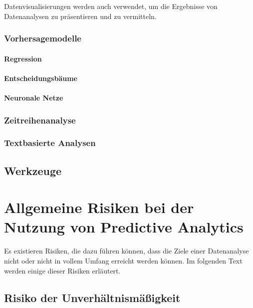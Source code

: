 Datenvisualisierungen werden auch verwendet, um die Ergebnisse von Datenanalysen
zu präsentieren und zu vermitteln. 

\subsubsection{Vorhersagemodelle}

\paragraph{Regression}

\paragraph{Entscheidungsbäume}

\paragraph{Neuronale Netze}

\subsubsection{Zeitreihenanalyse}


\subsubsection{Textbasierte Analysen}

\subsection{Werkzeuge}


\section{Allgemeine Risiken bei der Nutzung von Predictive Analytics}

Es existieren Risiken, die dazu führen können, dass die Ziele einer
Datenanalyse nicht oder nicht in vollem Umfang erreicht werden können.
Im folgenden Text werden einige dieser Risiken erläutert.

\subsection{Risiko der Unverhältnismäßigkeit}

